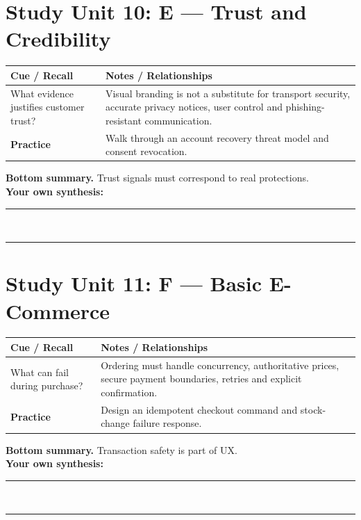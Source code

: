 \documentclass[11pt]{article}
\begin{document}
\section{Study Unit 10: E — Trust and Credibility}
\begin{longtable}{@{}p{.27\linewidth}p{.66\linewidth}@{}}\toprule
\textbf{Cue / Recall} & \textbf{Notes / Relationships}\\\midrule\endhead
What evidence justifies customer trust? & Visual branding is not a substitute for transport security, accurate privacy notices, user control and phishing-resistant communication.\\
\addlinespace[4mm]
\textbf{Practice} & Walk through an account recovery threat model and consent revocation.\\\bottomrule\end{longtable}
\begin{dosnotebox}\textbf{Bottom summary.} Trust signals must correspond to real protections.\\[2mm]
\textbf{Your own synthesis:} \rule{.72\linewidth}{.4pt}\\[4mm]
\rule{.96\linewidth}{.4pt}\end{dosnotebox}

\section{Study Unit 11: F — Basic E-Commerce}
\begin{longtable}{@{}p{.27\linewidth}p{.66\linewidth}@{}}\toprule
\textbf{Cue / Recall} & \textbf{Notes / Relationships}\\\midrule\endhead
What can fail during purchase? & Ordering must handle concurrency, authoritative prices, secure payment boundaries, retries and explicit confirmation.\\
\addlinespace[4mm]
\textbf{Practice} & Design an idempotent checkout command and stock-change failure response.\\\bottomrule\end{longtable}
\begin{dosnotebox}\textbf{Bottom summary.} Transaction safety is part of UX.\\[2mm]
\textbf{Your own synthesis:} \rule{.72\linewidth}{.4pt}\\[4mm]
\rule{.96\linewidth}{.4pt}\end{dosnotebox}
\end{document}
